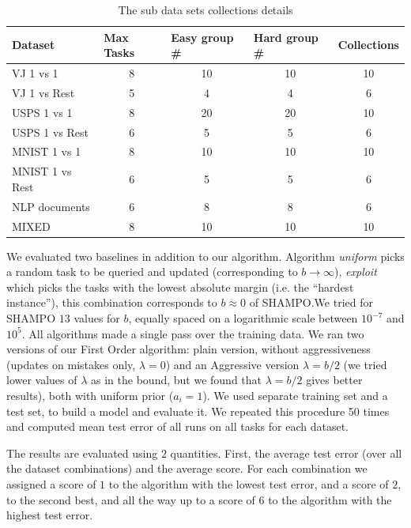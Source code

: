 \begin{table}[h]
\centering
\caption{The sub data sets collections details}
\label{tab:collections}
\begin{tabular}{|l|c|c|c|c|}
\hline
Dataset & \multicolumn{1}{l|}{Max Tasks} & \multicolumn{1}{l|}{Easy group \#} & \multicolumn{1}{l|}{Hard group \#} & \multicolumn{1}{l|}{Collections} \\ \hline
VJ 1 vs 1 & 8 & 10 & 10 & 10 \\ \cline{1-1}
VJ 1 vs Rest & 5 & 4 & 4 & 6 \\ \cline{1-1}
USPS 1 vs 1 & 8 & 20 & 20 & 10 \\ \cline{1-1}
USPS 1 vs Rest & 6 & 5 & 5 & 6 \\ \cline{1-1}
MNIST 1 vs 1 & 8 & 10 & 10 & 10 \\ \cline{1-1}
MNIST 1 vs Rest & 6 & 5 & 5 & 6 \\ \cline{1-1}
NLP documents & 6 & 8 & 8 & 6 \\ \cline{1-1}
MIXED & 8 & 10 & 10 & 10 \\ \hline
\end{tabular}
\end{table}


We evaluated two baselines in addition to our algorithm. Algorithm {\em uniform} picks a random task to be 
queried and updated (corresponding to $b\rightarrow\infty$), {\em exploit} which picks the tasks with the 
lowest absolute margin (i.e. the ``hardest instance''), this combination corresponds to $b \approx 0$ of 
SHAMPO.\@ We tried for SHAMPO $13$ values for $b$, equally spaced on a logarithmic scale between 
$10^{-7}$ and $10^{5}$. 
All algorithms made a single pass over the training data. We ran two versions of our First Order algorithm: 
plain version, without aggressiveness (updates on mistakes only, $\lambda=0$) and an 
Aggressive version $\lambda=b/2$ (we tried lower values of $\lambda$ as in the bound, 
but we found that $\lambda=b/2$ gives better results), both with uniform prior ($a_i=1$). 
We used separate training set and a test set, to build a model and evaluate it. We repeated this procedure 
50 times and computed mean test error of all runs on all tasks for each dataset. 

The results are evaluated using $2$ quantities. First, the average test error (over all the dataset combinations) 
and the average score. For each combination we assigned a score of $1$ to the algorithm with the lowest 
test error, and a score of $2$, to the second best, and all the way up to a score of $6$ to the algorithm with 
the highest test error.



